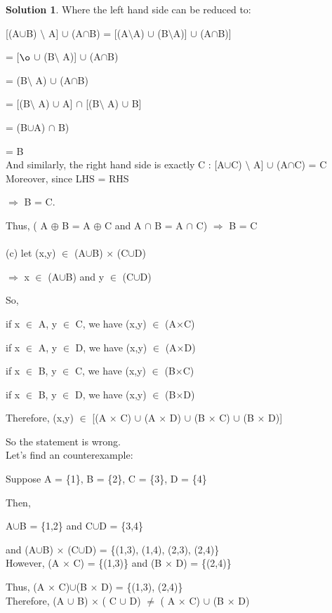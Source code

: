 \documentclass{article}
\theoremstyle{definition}
\newtheorem*{solution}{Solution}
\begin{document}
\begin{solution}
Where the left hand side can be reduced to:

[(A\(\cup\)B) \(\setminus\) A] \(\cup\) (A\(\cap\)B) = [(A\(\setminus\)A) \(\cup\) (B\(\setminus\)A)] \(\cup\) (A\(\cap\)B)]

= [\(\o\) \(\cup\) (B\(\setminus\) A)] \(\cup\) (A\(\cap\)B)

= (B\(\setminus\) A) \(\cup\) (A\(\cap\)B)

= [(B\(\setminus\) A) \(\cup\) A] \(\cap\) [(B\(\setminus\) A) \(\cup\) B] 

= (B\(\cup\)A) \(\cap\) B)

= B\\

And similarly, the right hand side is exactly C : [A\(\cup\)C) \(\setminus\) A] \(\cup\) (A\(\cap\)C) = C\\

Moreover, since LHS = RHS

\(\Rightarrow\) B = C.

Thus,  ( A \(\oplus\) B = A \(\oplus\) C and A \(\cap\) B = A \(\cap\) C) \(\Rightarrow\) B = C\\\\



(c) let (x,y) \(\in\) (A\(\cup\)B) \(\times\) (C\(\cup\)D)

\(\Rightarrow\) x \(\in\) (A\(\cup\)B) and y \(\in\) (C\(\cup\)D)

So, 

if x \(\in\) A, y \(\in\) C, we have (x,y) \(\in\) (A\(\times\)C)

if x \(\in\) A, y \(\in\) D, we have (x,y) \(\in\) (A\(\times\)D)

if x \(\in\) B, y \(\in\) C, we have (x,y) \(\in\) (B\(\times\)C)

if x \(\in\) B, y \(\in\) D, we have (x,y) \(\in\) (B\(\times\)D)

Therefore, (x,y) \(\in\) [(A \(\times\) C) \(\cup\) (A \(\times\) D) \(\cup\) (B \(\times\) C) \(\cup\) (B \(\times\) D)]

So the statement is wrong.\\

Let's find an counterexample:

Suppose A = \{1\}, B = \{2\}, C = \{3\}, D = \{4\}

Then,

A\(\cup\)B = \{1,2\} and C\(\cup\)D = \{3,4\}

and (A\(\cup\)B) \(\times\) (C\(\cup\)D) = \{(1,3), (1,4), (2,3), (2,4)\}\\

However, (A \(\times\) C) = \{(1,3)\} and (B \(\times\) D) = \{(2,4)\}

Thus, (A \(\times\) C)\(\cup\)(B \(\times\) D) = \{(1,3), (2,4)\}\\


Therefore, (A \(\cup\) B) \(\times\) ( C \(\cup\) D) \(\neq\) ( A \(\times\) C) \(\cup\) (B \(\times\) D)\\\\


\end{solution}
\end{document}
